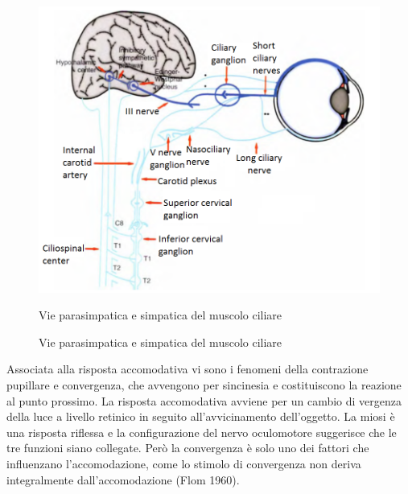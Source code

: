 \begin{figure}[h!]
	\centering
	\includegraphics[scale=0.70]{source/immagini/accomodazione.png}
	\caption{Vie parasimpatica e simpatica del muscolo ciliare}{Vie parasimpatica e simpatica del muscolo ciliare}
	\label{fig:test12}
\end{figure}
 
Associata alla risposta accomodativa vi sono i fenomeni della contrazione pupillare e convergenza, che avvengono per sincinesia e costituiscono la reazione al punto prossimo. La risposta accomodativa avviene per un cambio di vergenza della luce a livello retinico in seguito all’avvicinamento dell’oggetto. La miosi è una risposta riflessa e la configurazione del nervo oculomotore suggerisce che le tre funzioni siano collegate. Però la convergenza è solo uno dei fattori che influenzano l’accomodazione, come lo stimolo di convergenza non deriva integralmente dall’accomodazione (Flom 1960).

